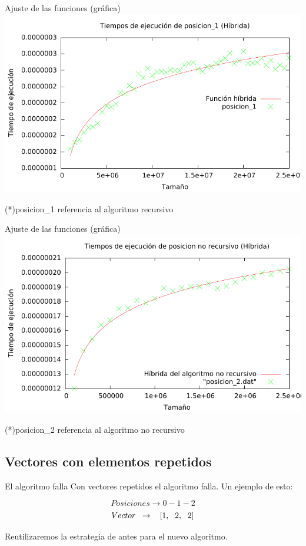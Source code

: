\begin{frame}{Ajuste de las funciones (gráfica)}
	\includegraphics[width=\textwidth]{img/posicion_1_hibrida.pdf}
	
	(*)posicion\_1 referencia al algoritmo recursivo
\end{frame}

\begin{frame}{Ajuste de las funciones (gráfica)}
	\includegraphics[width=\textwidth]{img/posicion_2_hibrida.pdf}
	
	
	(*)posicion\_2 referencia al algoritmo no recursivo
\end{frame}

\subsection{Vectores con elementos repetidos}

\begin{frame}{El algoritmo falla}
	Con vectores repetidos el algoritmo falla. Un ejemplo de esto:
	
$$Posiciones \rightarrow 0-1-2$$
$$Vector\hspace{0.2cm} \rightarrow \hspace{0.32cm} [1,\hspace{0.23cm}2,\hspace{0.23cm}2]$$

\pause
Reutilizaremos la estrategia de antes para el nuevo algoritmo.
\end{frame}

